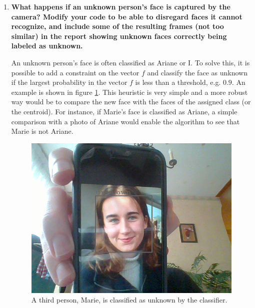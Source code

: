 \documentclass[a4paper, 11pt]{article}
\begin{document}
\begin{enumerate}
	\item \textbf{What happens if an unknown person's face is captured by the camera? Modify your code to be able to disregard faces it cannot recognize,
	and include some of the resulting frames (not too similar) in the report showing unknown faces correctly being labeled as unknown.}
	
	An unknown person's face is often classified as Ariane or I. To solve this, it is possible to add a constraint on the vector $f$ and classify the face as unknown if the largest probability in the vector $f$ is less than a threshold, e.g. $0.9$. An example is shown in figure \ref{fig:marie-unknown}. This heuristic is very simple and a more robust way would be to compare the new face with the faces of the assigned class (or the centroid). For instance, if Marie's face is classified as Ariane, a simple comparison with a photo of Ariane would enable the algorithm to see that Marie is not Ariane.
	
	\begin{figure}[!h]
	    \centering
	    \includegraphics[width=.6\textwidth]{images/q34_marie_unknown.png}
	    \caption{A third person, Marie, is classified as unknown by the classifier.}
	    \label{fig:marie-unknown}
	\end{figure}
	
\end{enumerate}
\end{document}
